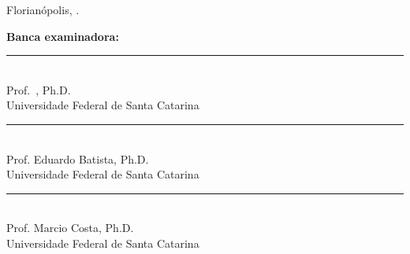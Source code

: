 \thispagestyle{empty}

\begin{center}
  \theauthor
\end{center}

\medskip
\begin{center}
  \textbf{\MakeUppercase{\thetitle}}
\end{center}

\medskip
{}

\begin{center}
  Florianópolis, \thedate.
\end{center}

\medskip
\begin{center}
  \textbf{Banca examinadora:}
\end{center}
\bigskip

 
\begin{center}
  \rule{60mm}{0.2mm}\\
  Prof.\ \theadvisor, Ph.D.\\
  {\footnotesize Universidade Federal de Santa Catarina}
\end{center}
\bigskip
\begin{center}
  \rule{60mm}{0.2mm}\\
  Prof. Eduardo Batista, Ph.D.\\
  {\footnotesize Universidade Federal de Santa Catarina}
\end{center}
\bigskip
\begin{center}
  \rule{60mm}{0.2mm}\\
  Prof. Marcio Costa, Ph.D.\\
  {\footnotesize Universidade Federal de Santa Catarina}
\end{center}




